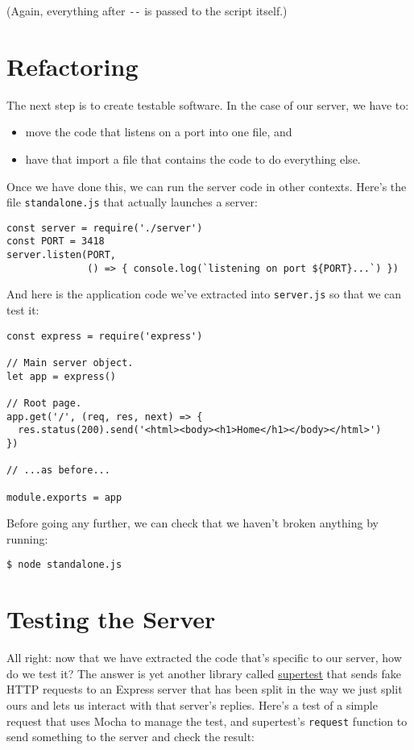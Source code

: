(Again, everything after \texttt{-\/-} is passed to the script itself.)

\section{Refactoring}\label{s:testing-refactoring}

The next step is to create testable software.
In the case of our server,
we have to:

\begin{itemize}
\item
  move the code that listens on a port into one file, and
\item
  have that import a file that contains the code to do everything else.
\end{itemize}

Once we have done this,
we can run the server code in other contexts.
Here's the file \texttt{standalone.js} that actually launches a server:

\begin{verbatim}
const server = require('./server')
const PORT = 3418
server.listen(PORT,
              () => { console.log(`listening on port ${PORT}...`) })
\end{verbatim}

And here is the application code we've extracted into \texttt{server.js}
so that we can test it:

\begin{verbatim}
const express = require('express')

// Main server object.
let app = express()

// Root page.
app.get('/', (req, res, next) => {
  res.status(200).send('<html><body><h1>Home</h1></body></html>')
})

// ...as before...

module.exports = app
\end{verbatim}

Before going any further,
we can check that we haven't broken anything by running:

\begin{verbatim}
$ node standalone.js
\end{verbatim}

\section{Testing the Server}\label{s:testing-server}

All right:
now that we have extracted the code that's specific to our server,
how do we test it?
The answer is yet another library called \href{https://github.com/visionmedia/supertest}{supertest}
that sends fake HTTP requests to an Express server
that has been split in the way we just split ours
and lets us interact with that server's replies.
Here's a test of a simple request that uses Mocha to manage the test,
and supertest's \texttt{request} function to send something to the server
and check the result:

